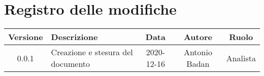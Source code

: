 \section*{Registro delle modifiche}

\begin{center}
	\begin{longtable}{|c|p{5cm}|c|c|c|}
	\hline
	\rowcolor{lighter-grayer}
	\textbf{Versione} & \textbf{Descrizione} & \textbf{Data} & \textbf{Autore} & \textbf{Ruolo} \\
	\hline
	\endfirsthead


	\hline
	0.0.1 & Creazione e stesura del documento & 2020-12-16 & Antonio Badan & Analista \\
	\hline

	\end{longtable}
\end{center}